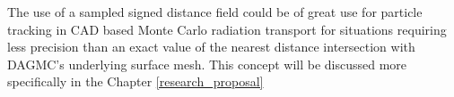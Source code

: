 \documentclass[12pt, a4paper]{article}
\begin{document}
The use of a sampled signed distance field could be of great use for particle tracking in CAD based Monte Carlo radiation transport for situations requiring less precision than an exact value of the nearest distance intersection with DAGMC's underlying surface mesh. This concept will be discussed more specifically in the Chapter \ref{research_proposal}













\end{document}

